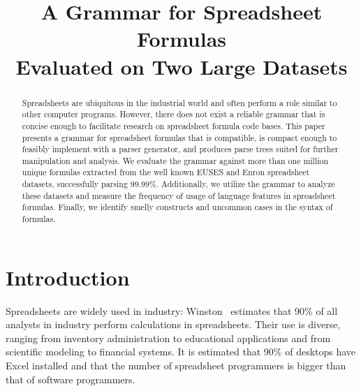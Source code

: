 \documentclass[conference]{IEEEtran}
\begin{document}
\title{A Grammar for Spreadsheet Formulas\\Evaluated on Two Large Datasets}

\author{
}
\maketitle

\begin{abstract}
Spreadsheets are ubiquitous in the industrial world and often perform a role similar to other computer programs.
However, there does not exist a reliable grammar that is concise enough to facilitate research on spreadsheet formula code bases.
This paper presents a grammar for spreadsheet formulas that is compatible, is compact enough to feasibly implement with a parser generator, and produces parse trees suited for further manipulation and analysis. 
We evaluate the grammar against more than one million unique formulas extracted from the well known EUSES and Enron spreadsheet datasets, successfully parsing 99.99\%.
Additionally, we utilize the grammar to analyze these datasets and measure the frequency of usage of language features in spreadsheet formulas.
Finally, we identify smelly constructs and uncommon cases in the syntax of formulas.
\end{abstract}

\IEEEpeerreviewmaketitle

\section{Introduction}
Spreadsheets are widely used in industry: Winston~\cite{Wins2001} estimates that 90\% of all analysts in industry perform calculations in
spreadsheets. Their use is diverse, ranging from inventory administration to educational applications and from scientific
modeling to financial systems. It is estimated that 90\% of desktops have Excel installed\cite{DBLP:conf/icse/BradleyM09} and that the number of spreadsheet programmers is bigger than that of software programmers\cite{DBLP:conf/vl/ScaffidiSM05}. 
\end{document}
